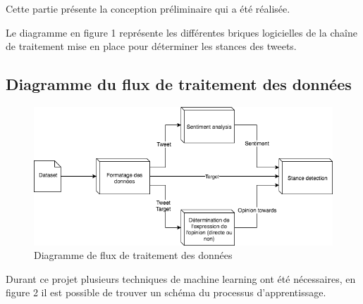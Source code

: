 \par Cette partie présente la conception préliminaire qui a été réalisée. \\

\par Le diagramme en figure 1 représente les différentes briques logicielles de la chaîne de traitement mise en place pour déterminer les stances des tweets.

\subsection{Diagramme du flux de traitement des données}
\begin{figure}[h!]
	\centerline{\includegraphics[scale=0.8]{img/diagramme_flux_traitement.png}}
	\caption{Diagramme de flux de traitement des données}
	\label{flux_diagram} 
\end{figure}
\newpage


\par Durant ce projet plusieurs techniques de machine learning ont été nécessaires, en figure 2 il est possible de trouver un schéma du processus d'apprentissage. \\ 

